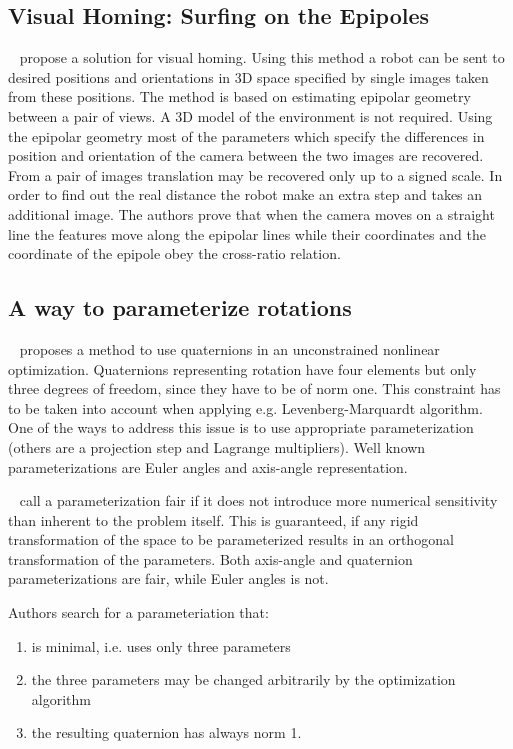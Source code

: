 \documentclass[10pt]{article}         %
\begin{document}
\subsection{Visual Homing: Surfing on the Epipoles}
~\cite{basri1999visual} propose a solution for visual homing.  Using
this method a robot can be sent to desired positions and orientations
in 3D space specified by single images taken from these positions.
The method is based on estimating epipolar geometry between a pair of
views. A 3D model of the environment is not required.  Using the
epipolar geometry most of the parameters which specify the differences
in position and orientation of the camera between the two images are
recovered.  From a pair of images translation may be recovered only up
to a signed scale.  In order to find out the real distance the robot
make an extra step and takes an additional image.  The authors prove
that when the camera moves on a straight line the features move along
the epipolar lines while their coordinates and the coordinate of the
epipole obey the cross-ratio relation.

\subsection{A way to parameterize rotations}
~\cite{schmidt2001using} proposes a method to use quaternions in an
unconstrained nonlinear optimization.  Quaternions representing
rotation have four elements but only three degrees of freedom, since
they have to be of norm one.  This constraint has to be taken into
account when applying e.g. Levenberg-Marquardt algorithm.  One of the
ways to address this issue is to use appropriate parameterization
(others are a projection step and Lagrange multipliers). Well known
parameterizations are Euler angles and axis-angle representation.

~\cite{hornegger1999representation} call a parameterization fair if it
does not introduce more numerical sensitivity than inherent to the
problem itself.  This is guaranteed, if any rigid transformation of
the space to be parameterized results in an orthogonal transformation
of the parameters.  Both axis-angle and quaternion parameterizations
are fair, while Euler angles is not.

Authors search for a parameteriation that:
\begin{enumerate}
\item is minimal, i.e. uses only three parameters
\item the three parameters may be changed arbitrarily by the optimization algorithm
\item the resulting quaternion has always norm 1.
\end{enumerate}
\end{document}
